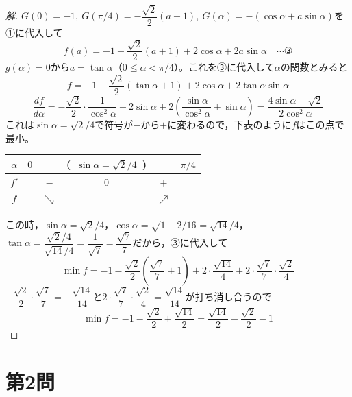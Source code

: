 \documentclass[../main.tex]{subfiles}
\begin{document}
\begin{proof}[解]
  $G(0)=-1,\ G(\pi/4)=-\dfrac{\sqrt2}2(a+1),\ G(\alpha)=-(\cos\alpha+a\sin\alpha)$を①に代入して
  \[
    f(a)=-1-\frac{\sqrt2}2(a+1)+2\cos\alpha+2a\sin\alpha \quad\cdots\text{③}
  \]
  $g(\alpha)=0$から$a=\tan\alpha$（$0\le\alpha<\pi/4$）。これを③に代入して$\alpha$の関数とみると
  \[
    f=-1-\frac{\sqrt2}2(\tan\alpha+1)+2\cos\alpha+2\tan\alpha\sin\alpha
  \]
  \[
    \frac{df}{d\alpha}=-\frac{\sqrt2}2\cdot\frac1{\cos^2\alpha}-2\sin\alpha+2\left(\frac{\sin\alpha}{\cos^2\alpha}+\sin\alpha\right)=\frac{4\sin\alpha-\sqrt2}{2\cos^2\alpha}
  \]
  これは$\sin\alpha=\sqrt2/4$で符号が$-$から$+$に変わるので，下表のように$f$はこの点で最小。
  \begin{center}
    \begin{tabular}{c|ccccc}
      $\alpha$ & $0$ & & (\ $\sin\alpha=\sqrt2/4$\ ) & & $\pi/4$ \\
      \hline
      $f'$ & & $-$ & $0$ & $+$ & \\
      \hline
      $f$ & & $\searrow$ & & $\nearrow$ &
    \end{tabular}
  \end{center}
  この時，$\sin\alpha=\sqrt2/4$，$\cos\alpha=\sqrt{1-2/16}=\sqrt{14}/4$，$\tan\alpha=\dfrac{\sqrt2/4}{\sqrt{14}/4}=\dfrac1{\sqrt7}=\dfrac{\sqrt7}7$だから，③に代入して
  \[
    \min f=-1-\frac{\sqrt2}2\left(\frac{\sqrt7}7+1\right)+2\cdot\frac{\sqrt{14}}4+2\cdot\frac{\sqrt7}7\cdot\frac{\sqrt2}4
  \]
  $-\dfrac{\sqrt2}2\cdot\dfrac{\sqrt7}7=-\dfrac{\sqrt{14}}{14}$と$2\cdot\dfrac{\sqrt7}7\cdot\dfrac{\sqrt2}4=\dfrac{\sqrt{14}}{14}$が打ち消し合うので
  \[
    \min f=-1-\frac{\sqrt2}2+\frac{\sqrt{14}}2=\frac{\sqrt{14}}2-\frac{\sqrt2}2-1
  \]
\end{proof}

\newpage

\section*{第2問}
\end{document}
